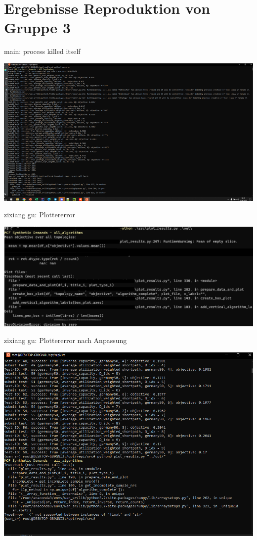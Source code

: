 \documentclass[aspectratio=169,10pt]{beamer}
\begin{document}
\section{Ergebnisse Reproduktion von Gruppe 3}
\begin{frame}{main: process killed itself}
\begin{center}
    \includegraphics[width=\textwidth]{images/err5.png}
\end{center}
\end{frame}
\begin{frame}{zixiang gu: Plottererror}
\begin{center}
    \includegraphics[width=\textwidth]{images/err3.png}
\end{center}
\end{frame}
\begin{frame}{zixiang gu: Plottererror nach Anpassung}
\begin{center}
    \includegraphics[width=\textwidth]{images/err1.png}
\end{center}
\end{frame}
\end{document}
